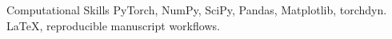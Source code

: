 \begin{rubric}{Computational Skills}
\entry*[Python] PyTorch, NumPy, SciPy, Pandas, Matplotlib, torchdyn.
 LaTeX, reproducible manuscript workflows.
\end{rubric}
